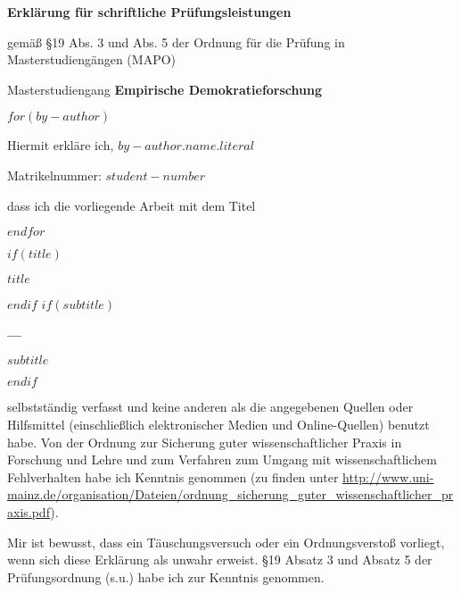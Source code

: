 \newcommand*\wildcard[2][7.5cm]{\vspace*{2cm}\parbox{#1}{\hrulefill\par#2}}
\cleardoublepage
\thispagestyle{empty}
{\sffamily
    \begin{center}
        {\LARGE\bfseries Erklärung für schriftliche Prüfungsleistungen \par}
        {\normalsize gemäß §19 Abs. 3 und Abs. 5 der Ordnung für die Prüfung in Masterstudiengängen (MAPO) \par}
        \vspace{.5em}
    \end{center}
    {\normalsize Masterstudiengang \bfseries Empirische Demokratieforschung \par}
    \vspace{.5em}
    $for(by-author)$
    {\normalsize Hiermit erkläre ich, \bfseries $by-author.name.literal$ \par}
    {\normalsize Matrikelnummer: \bfseries $student-number$ \par}
    {\normalsize dass ich die vorliegende Arbeit mit dem Titel \par}
    $endfor$
    \begin{center}
        $if(title)$
        {\Large\bfseries $title$ \par}
        $endif$
        $if(subtitle)$
        {\large\bfseries --- \par}
        {\large\bfseries $subtitle$ \par}
        $endif$
        \vspace{1em}
    \end{center}
    {\fontsize{12}{12}\raggedright selbstständig verfasst und keine anderen als die angegebenen Quellen oder Hilfsmittel (einschließlich elektronischer Medien und Online-Quellen) benutzt habe. Von der Ordnung zur Sicherung guter wissenschaftlicher Praxis in Forschung und Lehre und zum Verfahren zum Umgang mit wissenschaftlichem Fehlverhalten habe ich Kenntnis genommen (zu finden unter \url{http://www.uni-mainz.de/organisation/Dateien/ordnung_sicherung_guter_wissenschaftlicher_praxis.pdf}). \par}
    \vspace{1em}
    {\fontsize{12}{12}\raggedright Mir ist bewusst, dass ein Täuschungsversuch oder ein Ordnungsverstoß vorliegt, wenn sich diese Erklärung als unwahr erweist. §19 Absatz 3 und Absatz 5 der Prüfungsordnung (s.u.) habe ich zur Kenntnis genommen. \par}
}
